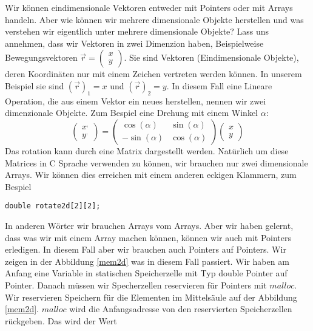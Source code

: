 Wir können eindimensionale Vektoren entweder mit Pointers oder mit Arrays handeln.
Aber wie können wir mehrere dimensionale Objekte herstellen und was verstehen wir eigentlich 
unter mehrere dimensionale Objekte? Lass uns annehmen, dass wir Vektoren in zwei Dimenzion haben,
Beispielweise Bewegungsvektoren $\vec{r}=\left(\begin{array}{c}x\\y\end{array}\right)$. Sie sind 
Vektoren (Eindimensionale Objekte), deren Koordinäten nur mit einem Zeichen vertreten werden
können. In unserem Beispiel sie sind $\left(\vec{r}\right)_1=x$ und $\left(\vec{r}\right)_2=y$.
In diesem Fall eine Lineare Operation, die aus einem Vektor ein neues herstellen, nennen
wir zwei dimenzionale Objekte. Zum Bespiel eine Drehung mit einem Winkel $\alpha$:
\begin{equation}
\left(\begin{array}{c}x^{,}\\y^{,}\end{array}\right)=
\left(\begin{array}{cc} \cos\left(\alpha\right) & \sin\left(\alpha\right) \\
                       -\sin\left(\alpha\right) & \cos\left(\alpha\right) 
\end{array}\right)
\left(\begin{array}{c}x\\y\end{array}\right)
\end{equation}
Das rotation kann durch eine Matrix dargestellt werden. Natürlich um diese Matrices
in C Sprache verwenden zu können, wir brauchen nur zwei dimensionale Arrays. Wir können
dies erreichen mit einem anderen eckigen Klammern, zum Bespiel 
\begin{lstlisting}
double rotate2d[2][2];
\end{lstlisting}
In anderen Wörter wir brauchen Arrays vom Arrays.
Aber wir haben gelernt, dass was wir mit einem Array machen können, können wir auch 
mit Pointers erledigen. In diesem Fall aber wir brauchen auch Pointers auf Pointers.
Wir zeigen in der Abbildung \ref{mem2d} was in diesem Fall passiert. Wir haben am Anfang 
eine Variable in statischen Speicherzelle mit Typ double Pointer auf Pointer.
Danach müssen wir Specherzellen reservieren für Pointers mit $malloc$. Wir reservieren
Speichern für die Elementen im Mittelsäule auf der Abbildung \ref{mem2d}. $malloc$
wird die Anfangsadresse von den reservierten Speicherzellen rückgeben. Das wird der Wert
